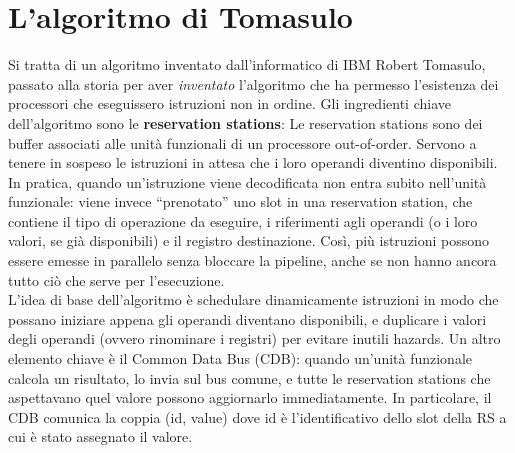 \section{L'algoritmo di Tomasulo}
Si tratta di un algoritmo inventato dall'informatico di IBM Robert Tomasulo, passato alla storia per aver \textit{inventato} l'algoritmo che ha permesso l'esistenza dei processori che eseguissero istruzioni non in ordine. 
Gli ingredienti chiave dell'algoritmo sono le \textbf{reservation stations}: Le reservation stations sono dei buffer associati alle unità funzionali di un processore out-of-order. Servono a tenere in sospeso le istruzioni in attesa che i loro operandi diventino disponibili. In pratica, quando un'istruzione viene decodificata non entra subito nell'unità funzionale: viene invece “prenotato” uno slot in una reservation station, che contiene il tipo di operazione da eseguire, i riferimenti agli operandi (o i loro valori, se già disponibili) e il registro destinazione. Così, più istruzioni possono essere emesse in parallelo senza bloccare la pipeline, anche se non hanno ancora tutto ciò che serve per l'esecuzione.
\\ \noindent L'idea di base dell'algoritmo è schedulare dinamicamente istruzioni in modo che possano iniziare appena gli operandi diventano disponibili, e duplicare i valori degli operandi (ovvero rinominare i registri) per evitare inutili hazards. Un altro elemento chiave è il Common Data Bus (CDB): quando un'unità funzionale calcola un risultato, lo invia sul bus comune, e tutte le reservation stations che aspettavano quel valore possono aggiornarlo immediatamente. In particolare, il CDB comunica la coppia (id, value) dove id è l'identificativo dello slot della RS a cui è stato assegnato il valore. 

\begin{figure}[ht]
    \centering
    \setlength{\fboxrule}{0.7pt} %
    \setlength{\fboxsep}{0pt}    %
\end{figure}

